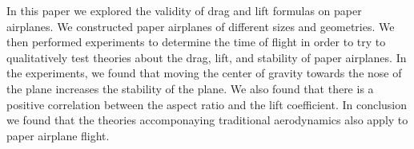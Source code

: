 % 
% 
%
In this paper we explored the validity of drag and lift formulas on 
paper airplanes. We constructed paper airplanes of different sizes and geometries. 
We then performed experiments to determine the time of flight in order to try to qualitatively 
test theories about the drag, lift, and stability of paper airplanes.
In the experiments, we found that moving the center of gravity towards the nose of the plane
increases the stability of the plane. We also found that there is a positive correlation between
the aspect ratio and the lift coefficient. In conclusion we found that the theories accomponaying
traditional aerodynamics also apply to paper airplane flight.
